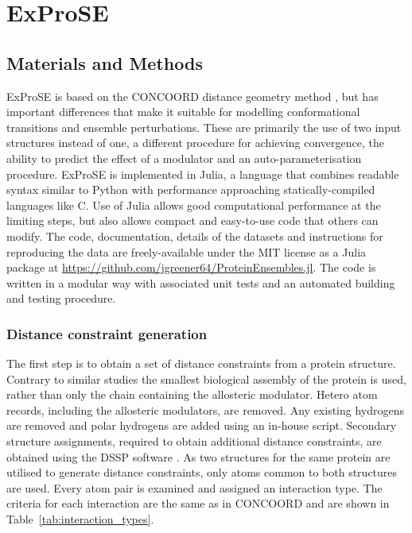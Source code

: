 \chapter{ExProSE}

\section{Materials and Methods}

ExProSE is based on the CONCOORD distance geometry method \cite{DeGroot1997}, but has important differences that make it suitable for modelling conformational transitions and ensemble perturbations.
These are primarily the use of two input structures instead of one, a different procedure for achieving convergence, the ability to predict the effect of a modulator and an auto-parameterisation procedure.
ExProSE is implemented in Julia, a language that combines readable syntax similar to Python with performance approaching statically-compiled languages like C.
Use of Julia allows good computational performance at the limiting steps, but also allows compact and easy-to-use code that others can modify.
The code, documentation, details of the datasets and instructions for reproducing the data are freely-available under the MIT license as a Julia package at \url{https://github.com/jgreener64/ProteinEnsembles.jl}.
The code is written in a modular way with associated unit tests and an automated building and testing procedure.


\subsection{Distance constraint generation}

The first step is to obtain a set of distance constraints from a protein structure.
Contrary to similar studies \cite{Panjkovich2012, Huang2013} the smallest biological assembly of the protein is used, rather than only the chain containing the allosteric modulator.
Hetero atom records, including the allosteric modulators, are removed.
Any existing hydrogens are removed and polar hydrogens are added using an in-house script.
Secondary structure assignments, required to obtain additional distance constraints, are obtained using the DSSP software \cite{Touw2015}.
As two structures for the same protein are utilised to generate distance constraints, only atoms common to both structures are used.
Every atom pair is examined and assigned an interaction type.
The criteria for each interaction are the same as in CONCOORD \cite{DeGroot1997} and are shown in Table~\ref{tab:interaction_types}.


